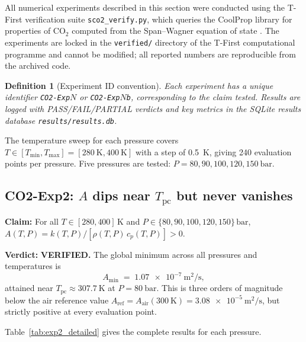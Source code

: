 \documentclass[12pt,a4paper]{article}
\newtheorem{definition}[theorem]{Definition}
\newcommand{\Tc}{T_{\mathrm{pc}}}   %
\newcommand{\Amin}{A_{\min}}
\newcommand{\Aref}{A_{\mathrm{ref}}}
\begin{document}
All numerical experiments described in this section were conducted using the
T-First verification suite \texttt{sco2\_verify.py}, which queries the CoolProp
library \citep{Bell2014} for properties of CO$_2$ computed from the
Span--Wagner equation of state \citep{Span1996}.  The experiments are locked in
the \texttt{verified/} directory of the T-First computational programme and cannot
be modified; all reported numbers are reproducible from the archived code.

\begin{definition}[Experiment ID convention]
  Each experiment has a unique identifier \texttt{CO2-Exp$N$} or \texttt{CO2-Exp$N$b},
  corresponding to the claim tested.  Results are logged with PASS/FAIL/PARTIAL
  verdicts and key metrics in the SQLite results database \texttt{results/results.db}.
\end{definition}

The temperature sweep for each pressure covers
$T \in [T_{\min}, T_{\max}] = [\SI{280}{\kelvin}, \SI{400}{\kelvin}]$
with a step of \SI{0.5}{\kelvin}, giving 240 evaluation points per pressure.
Five pressures are tested: $P = 80, 90, 100, 120, \SI{150}{\bar}$.

\subsection{CO2-Exp2: $A$ dips near $\Tc$ but never vanishes}
\label{sec:numerical:exp2}

\textbf{Claim:} For all $T \in [280, 400]\,\si{\kelvin}$ and
$P \in \{80, 90, 100, 120, 150\}\,\si{\bar}$,
$A(T,P) = k(T,P)/[\rho(T,P)\,c_p(T,P)] > 0$.

\textbf{Verdict:} \textbf{VERIFIED.} The global minimum across all pressures
and temperatures is
\begin{equation}
  \Amin \;=\; \SI{1.07e-7}{\metre\squared\per\second},
  \label{eq:A_min_value}
\end{equation}
attained near $\Tc \approx \SI{307.7}{\kelvin}$ at $P = \SI{80}{\bar}$.
This is three orders of magnitude below the air reference value
$\Aref = A_{\mathrm{air}}(\SI{300}{\kelvin}) = \SI{3.08e-5}{\metre\squared\per\second}$,
but strictly positive at every evaluation point.

Table~\ref{tab:exp2_detailed} gives the complete results for each pressure.
\end{document}
